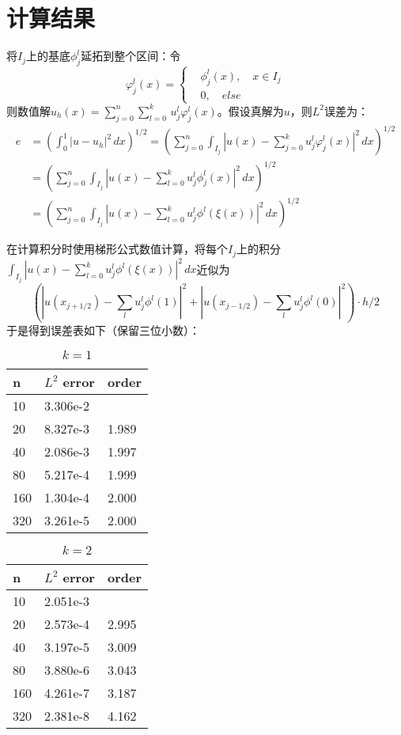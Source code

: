 \documentclass[12pt, a4paper]{ctexart}
\begin{document}
	\section{计算结果}
	
	将$I_j$上的基底$\phi_j^l$延拓到整个区间：令
	$$
	\varphi_j^l (x) = 
	\begin{cases}
	& \phi_j^l(x), \quad x \in I_j\\
	& 0, \quad else
	\end{cases}
	$$
	则数值解$u_h(x) = \sum_{j=0}^n \sum_{l=0}^k \, u_j^l \varphi_j^l(x)$。假设真解为$u$，则$L^2$误差为：
	\begin{equation}
	\begin{split}
	e & = (\int_0^1 |u - u_h|^2 \, dx)^{1/2} = (\sum_{j=0}^n \int_{I_j} |u(x)-\sum_{j=0}^k u_j^l \varphi_j^l(x) |^2 \, dx )^{1/2}\\
	& = (\sum_{j=0}^n \int_{I_j} |u(x) - \sum_{l=0}^k u_j^l \phi_j^l(x)|^2 \, dx )^{1/2}\\
	& = (\sum_{j=0}^n \int_{I_j} |u(x) - \sum_{l=0}^k u_j^l \phi^l (\xi(x)) |^2 \, dx )^{1/2}
	\end{split}
	\end{equation}
	
	在计算积分时使用梯形公式数值计算，将每个$I_j$上的积分$\int_{I_j} |u(x) - \sum_{l=0}^k u_j^l \phi^l (\xi(x)) |^2 \, dx$近似为
	$$
	( |u(x_{j+1/2}) - \sum_l u_j^l \phi^l(1) |^2 + | u(x_{j-1/2}) - \sum_l u_j^l \phi^l(0) |^2 ) \cdot h /2
	$$
	于是得到误差表如下（保留三位小数）：
	\begin{table}[htbp]
		\centering
		\caption{$k=1$}
		\begin{tabular}{| p{80pt}<{\centering} | p{80pt}<{\centering} | p{80pt}<{\centering} |}
			\hline
			n & $L^2$ error & order\\
			\hline
			10 & 3.306e-2 &  \\
			\hline
			20 & 8.327e-3 & 1.989 \\
			\hline
			40 & 2.086e-3 & 1.997 \\
			\hline
			80 & 5.217e-4 & 1.999 \\
			\hline
			160 & 1.304e-4 & 2.000 \\
			\hline
			320 & 3.261e-5 & 2.000 \\
			\hline
		\end{tabular}
	\end{table}

	\begin{table}[htbp]
		\centering
		\caption{$k=2$}
		\begin{tabular}{| p{80pt}<{\centering} | p{80pt}<{\centering} | p{80pt}<{\centering} |}
			\hline
			n & $L^2$ error & order\\
			\hline
			10 & 2.051e-3 &  \\
			\hline
			20 & 2.573e-4 & 2.995 \\
			\hline
			40 & 3.197e-5 & 3.009 \\
			\hline
			80 & 3.880e-6 & 3.043 \\
			\hline
			160 & 4.261e-7 & 3.187 \\
			\hline
			320 & 2.381e-8 & 4.162 \\
			\hline
		\end{tabular}
	\end{table}
\end{document}

